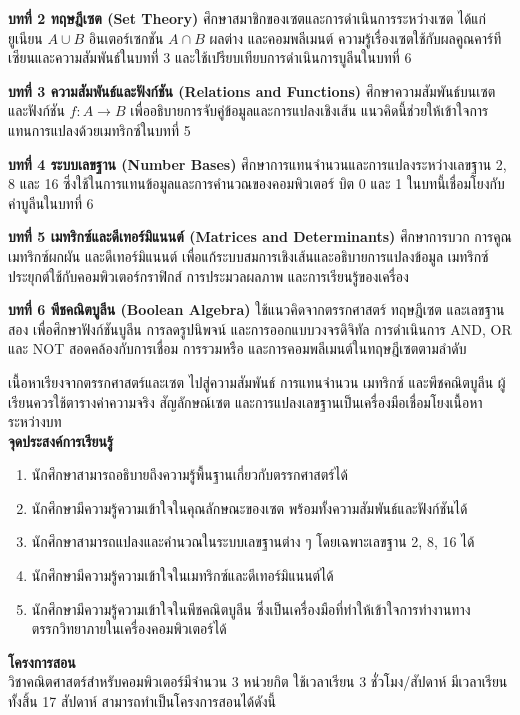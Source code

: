 \textbf{บทที่ 2 ทฤษฎีเซต (Set Theory)} ศึกษาสมาชิกของเซตและการดำเนินการระหว่างเซต ได้แก่ ยูเนียน $A \cup B$ อินเตอร์เซกชัน $A \cap B$ ผลต่าง และคอมพลีเมนต์ ความรู้เรื่องเซตใช้กับผลคูณคาร์ทีเซียนและความสัมพันธ์ในบทที่ 3 และใช้เปรียบเทียบการดำเนินการบูลีนในบทที่ 6

\textbf{บทที่ 3 ความสัมพันธ์และฟังก์ชัน (Relations and Functions)} ศึกษาความสัมพันธ์บนเซตและฟังก์ชัน $f: A \rightarrow B$ เพื่ออธิบายการจับคู่ข้อมูลและการแปลงเชิงเส้น แนวคิดนี้ช่วยให้เข้าใจการแทนการแปลงด้วยเมทริกซ์ในบทที่ 5

\textbf{บทที่ 4 ระบบเลขฐาน (Number Bases)} ศึกษาการแทนจำนวนและการแปลงระหว่างเลขฐาน 2, 8 และ 16 ซึ่งใช้ในการแทนข้อมูลและการคำนวณของคอมพิวเตอร์ บิต 0 และ 1 ในบทนี้เชื่อมโยงกับค่าบูลีนในบทที่ 6

\textbf{บทที่ 5 เมทริกซ์และดีเทอร์มิแนนต์ (Matrices and Determinants)} ศึกษาการบวก การคูณ เมทริกซ์ผกผัน และดีเทอร์มิแนนต์ เพื่อแก้ระบบสมการเชิงเส้นและอธิบายการแปลงข้อมูล เมทริกซ์ประยุกต์ใช้กับคอมพิวเตอร์กราฟิกส์ การประมวลผลภาพ และการเรียนรู้ของเครื่อง

\textbf{บทที่ 6 พีชคณิตบูลีน (Boolean Algebra)} ใช้แนวคิดจากตรรกศาสตร์ ทฤษฎีเซต และเลขฐานสอง เพื่อศึกษาฟังก์ชันบูลีน การลดรูปนิพจน์ และการออกแบบวงจรดิจิทัล การดำเนินการ AND, OR และ NOT สอดคล้องกับการเชื่อม การรวมหรือ และการคอมพลีเมนต์ในทฤษฎีเซตตามลำดับ

เนื้อหาเรียงจากตรรกศาสตร์และเซต ไปสู่ความสัมพันธ์ การแทนจำนวน เมทริกซ์ และพีชคณิตบูลีน ผู้เรียนควรใช้ตารางค่าความจริง สัญลักษณ์เซต และการแปลงเลขฐานเป็นเครื่องมือเชื่อมโยงเนื้อหาระหว่างบท
\\[0.5em]
\noindent
\textbf{จุดประสงค์การเรียนรู้}\\
\begin{enumerate}
    \item นักศึกษาสามารถอธิบายถึงความรู้พื้นฐานเกี่ยวกับตรรกศาสตร์ได้
    \item นักศึกษามีความรู้ความเข้าใจในคุณลักษณะของเซต พร้อมทั้งความสัมพันธ์และฟังก์ชันได้
    \item นักศึกษาสามารถแปลงและคำนวณในระบบเลขฐานต่าง ๆ โดยเฉพาะเลขฐาน 2, 8, 16 ได้
    \item นักศึกษามีความรู้ความเข้าใจในเมทริกซ์และดีเทอร์มิแนนต์ได้
    \item นักศึกษามีความรู้ความเข้าใจในพีชคณิตบูลีน ซึ่งเป็นเครื่องมือที่ทำให้เข้าใจการทำงานทางตรรกวิทยาภายในเครื่องคอมพิวเตอร์ได้
\end{enumerate}

\noindent
\textbf{\normalsize โครงการสอน} \\
\indent
วิชาคณิตศาสตร์สำหรับคอมพิวเตอร์มีจำนวน 3 หน่วยกิต ใช้เวลาเรียน 3 ชั่วโมง/สัปดาห์ มีเวลาเรียนทั้งสิ้น 17 สัปดาห์ สามารถทำเป็นโครงการสอนได้ดังนี้

